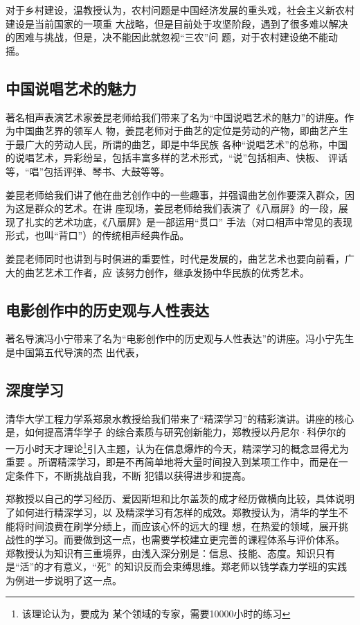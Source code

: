 \documentclass[a4paper]{cctart}
\numberwithin{equation}{section} \pagestyle{fancy}
\begin{document}
对于乡村建设，温教授认为，农村问题是中国经济发展的重头戏，社会主义新农村建设是当前国家的一项重
大战略，但是目前处于攻坚阶段，遇到了很多难以解决的困难与挑战，但是，决不能因此就忽视“三农”问
题，对于农村建设绝不能动摇。
\subsection{中国说唱艺术的魅力}
著名相声表演艺术家姜昆老师给我们带来了名为“中国说唱艺术的魅力”的讲座。作为中国曲艺界的领军人
物，姜昆老师对于曲艺的定位是劳动的产物，即曲艺产生于最广大的劳动人民，所谓的曲艺，即是中华民族
各种“说唱艺术”的总称，中国的说唱艺术，异彩纷呈，包括丰富多样的艺术形式，“说”包括相声、快板、
评话等，“唱”包括评弹、琴书、大鼓等等。

姜昆老师给我们讲了他在曲艺创作中的一些趣事，并强调曲艺创作要深入群众，因为这是群众的艺术。在讲
座现场，姜昆老师给我们表演了《八扇屏》的一段，展现了扎实的艺术功底，《八扇屏》是一部运用“贯口”
手法（对口相声中常见的表现形式，也叫“背口”）的传统相声经典作品。

姜昆老师同时也讲到与时俱进的重要性，时代是发展的，曲艺艺术也要向前看，广大的曲艺艺术工作者，应
该努力创作，继承发扬中华民族的优秀艺术。
\subsection{电影创作中的历史观与人性表达}
著名导演冯小宁带来了名为“电影创作中的历史观与人性表达”的讲座。冯小宁先生是中国第五代导演的杰
出代表，

\subsection{深度学习}
清华大学工程力学系郑泉水教授给我们带来了“精深学习”的精彩演讲。讲座的核心是，如何提高清华学子
的综合素质与研究创新能力，郑教授以丹尼尔·科伊尔的一万小时天才理论\footnote{该理论认为，要成为
某个领域的专家，需要10000小时的练习}引入主题，认为在信息爆炸的今天，精深学习的概念显得尤为重要
。所谓精深学习，即是不再简单地将大量时间投入到某项工作中，而是在一定条件下，不断挑战自我，不断
犯错以获得进步和提高。

郑教授以自己的学习经历、爱因斯坦和比尔盖茨的成才经历做横向比较，具体说明了如何进行精深学习，以
及精深学习有怎样的成效。郑教授认为，清华的学生不能将时间浪费在刷学分绩上，而应该心怀的远大的理
想，在热爱的领域，展开挑战性的学习。而要做到这一点，也需要学校建立更完善的课程体系与评价体系。
郑教授认为知识有三重境界，由浅入深分别是：信息、技能、态度。知识只有是“活”的才有意义，“死”
的知识反而会束缚思维。郑老师以钱学森力学班的实践为例进一步说明了这一点。
\end{document}
